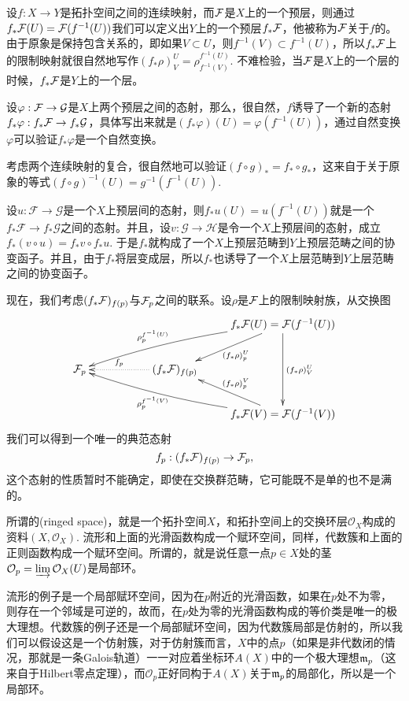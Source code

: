 \begin{para}[顺像]\label{sx}
设$f:X\to Y$是拓扑空间之间的连续映射，而$\mathcal{F}$是$X$上的一个预层，则通过$f_*\mathcal{F}(U)=\mathcal{F}(f^{-1}(U))$我们可以定义出$Y$上的一个预层$f_*\mathcal{F}$，他被称为$\mathcal{F}$关于$f$的。 由于原象是保持包含关系的，即如果$V\subset U$，则$f^{-1}(V)\subset f^{-1}(U)$，所以$f_*\mathcal{F}$上的限制映射就很自然地写作$(f_*\rho)^U_V=\rho^{f^{-1}(U)}_{f^{-1}(V)}$. 不难检验，当$\mathcal{F}$是$X$上的一个层的时候，$f_*\mathcal{F}$是$Y$上的一个层。

设$\varphi:\mathcal{F}\to\mathcal{G}$是$X$上两个预层之间的态射，那么，很自然，$f$诱导了一个新的态射$f_*\varphi:f_*\mathcal{F}\to f_*\mathcal{G}$，具体写出来就是$(f_*\varphi)(U)=\varphi(f^{-1}(U))$，通过自然变换$\varphi$可以验证$f_*\varphi$是一个自然变换。

考虑两个连续映射的复合，很自然地可以验证$(f\circ g)_*=f_*\circ g_*$，这来自于关于原象的等式$(f\circ g)^{-1}(U)=g^{-1}(f^{-1}(U))$. 

设$u:\mathcal{F}\to\mathcal{G}$是一个$X$上预层间的态射，则$f_*u(U)=u(f^{-1}(U))$就是一个$f_*\mathcal{F}\to f_*\mathcal{G}$之间的态射。并且，设$v:\mathcal{G}\to\mathcal{H}$是令一个$X$上预层间的态射，成立$f_*(v\circ u)=f_*v\circ f_* u$. 于是$f_*$就构成了一个$X$上预层范畴到$Y$上预层范畴之间的协变函子。并且，由于$f_*$将层变成层，所以$f_*$也诱导了一个$X$上层范畴到$Y$上层范畴之间的协变函子。
\end{para}

现在，我们考虑$(f_*\mathcal{F})_{f(p)}$与$\mathcal{F}_p$之间的联系。设$\rho$是$\mathcal{F}$上的限制映射族，从交换图
\[
	\xymatrix{
		&&&f_*\calf(U)=\calf(f^{-1}(U))\ar[dl]^{(f_*\rho)_{p}^U}\ar[dd]^{(f_*\rho)^U_{V}}\ar@/_/[llld]_-{\rho_{p}^{f^{-1}(U)}} \\
		\calf_p&&(f_*\calf)_{f(p)}\ar@{.>}[ll]_-{f_p}&\\
		&&&f_*\calf(V)=\calf(f^{-1}(V))\ar[ul]_{(f_*\rho)_{p}^V}\ar@/^/[lllu]^-{\rho_{p}^{f^{-1}(V)}}
	}
\]
我们可以得到一个唯一的典范态射
\[
f_p:(f_*\mathcal{F})_{f(p)}\to \mathcal{F}_p,
\]
这个态射的性质暂时不能确定，即使在交换群范畴，它可能既不是单的也不是满的。

\begin{para}[赋环空间]
所谓的(ringed space)，就是一个拓扑空间$X$，和拓扑空间上的交换环层$\mathcal{O}_X$构成的资料$(X,\mathcal{O}_X)$. 流形和上面的光滑函数构成一个赋环空间，同样，代数簇和上面的正则函数构成一个赋环空间。所谓的，就是说任意一点$p\in X$处的茎$\mathcal{O}_p=\varinjlim \mathcal{O}_X(U)$是局部环。
\end{para}

流形的例子是一个局部赋环空间，因为在$p$附近的光滑函数，如果在$p$处不为零，则存在一个邻域是可逆的，故而，在$p$处为零的光滑函数构成的等价类是唯一的极大理想。代数簇的例子还是一个局部赋环空间，因为代数簇局部是仿射的，所以我们可以假设这是一个仿射簇，对于仿射簇而言，$X$中的点$p$（如果是非代数闭的情况，那就是一条Galois轨道）一一对应着坐标环$A(X)$中的一个极大理想$\mathfrak{m}_p$（这来自于Hilbert零点定理），而$\mathcal{O}_p$正好同构于$A(X)$关于$\mathfrak{m}_p$的局部化，所以是一个局部环。

